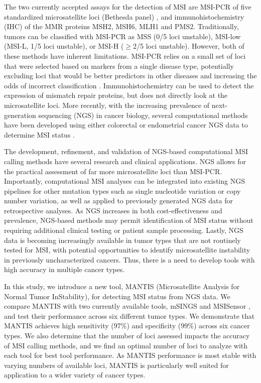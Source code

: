 The two currently accepted assays for the detection of MSI are MSI-PCR of five standardized microsatellite loci (Bethesda panel) \cite{boland1998}, and immunohistochemistry (IHC) of the MMR proteins MSH2, MSH6, MLH1 and PMS2. Traditionally, tumors can be classified with MSI-PCR as MSS (0/5 loci unstable), MSI-low (MSI-L, 1/5 loci unstable), or MSI-H ($\ge$2/5 loci unstable). However, both of these methods have inherent limitations. MSI-PCR relies on a small set of loci that were selected based on markers from a single disease type, potentially excluding loci that would be better predictors in other diseases and increasing the odds of incorrect classification \cite{boland1998}. Immunohistochemistry can be used to detect the expression of mismatch repair proteins, but does not directly look at the microsatellite loci. More recently, with the increasing prevalence of next-generation sequencing (NGS) in cancer biology, several computational methods have been developed using either colorectal or endometrial cancer NGS data to determine MSI status \cite{salipante2014,niu2013}.

The development, refinement, and validation of NGS-based computational MSI calling methods have several research and clinical applications. NGS allows for the practical assessment of far more microsatellite loci than MSI-PCR\@. Importantly, computational MSI analyses can be integrated into existing NGS pipelines for other mutation types such as single nucleotide variation or copy number variation, as well as applied to previously generated NGS data for retrospective analyses. As NGS increases in both cost-effectiveness and prevalence, NGS-based methods may permit identification of MSI status without requiring additional clinical testing or patient sample processing. Lastly, NGS data is becoming increasingly available in tumor types that are not routinely tested for MSI, with potential opportunities to identify microsatellite instability in previously uncharacterized cancers. Thus, there is a need to develop tools with high accuracy in multiple cancer types.

In this study, we introduce a new tool, MANTIS (Microsatellite Analysis for Normal Tumor InStability), for detecting MSI status from NGS data. We compare MANTIS with two currently available tools, mSINGS \cite{salipante2014} and MSISensor \cite{niu2013}, and test their performance across six different tumor types. We demonstrate that MANTIS achieves high sensitivity (97\%) and specificity (99\%) across six cancer types. We also determine that the number of loci assessed impacts the accuracy of MSI calling methods, and we find an optimal number of loci to analyze with each tool for best tool performance. As MANTIS performance is most stable with varying numbers of available loci, MANTIS is particularly well suited for application to a wider variety of cancer types.

